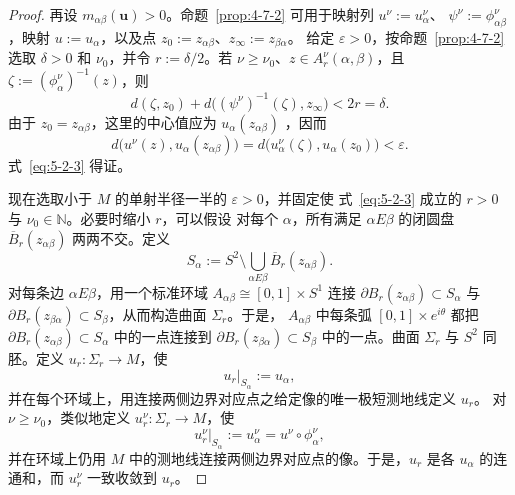 \begin{proof}
再设 $m_{\alpha\beta}(\mathbf u)>0$。命题~\ref{prop:4-7-2} 可用于映射列
$u^\nu:=u_\alpha^\nu$、
$\psi^\nu:=\phi_{\alpha\beta}^\nu$
，映射
$u:=u_\alpha$，以及点 $z_0:=z_{\alpha\beta}$、$z_\infty:=z_{\beta\alpha}$。
给定 $\varepsilon>0$，按命题~\ref{prop:4-7-2} 选取 $\delta>0$ 和 $\nu_0$，并令
$r:=\delta/2$。若 $\nu\ge\nu_0$、$z\in A_r^\nu(\alpha,\beta)$，且
$\zeta:=(\phi_\alpha^\nu)^{-1}(z)$，则
\[
  d(\zeta,z_0)+d\bigl((\psi^\nu)^{-1}(\zeta),z_\infty\bigr)<2r=\delta.
\]
由于 $z_0=z_{\alpha\beta}$，这里的中心值应为
$u_\alpha(z_{\alpha\beta})$
，因而
\[
  d\bigl(u^\nu(z),u_\alpha(z_{\alpha\beta})\bigr)
  =d\bigl(u_\alpha^\nu(\zeta),u_\alpha(z_0)\bigr)<\varepsilon.
\]
式~\eqref{eq:5-2-3} 得证。

现在选取小于 $M$ 的单射半径一半的 $\varepsilon>0$，并固定使
式~\eqref{eq:5-2-3} 成立的 $r>0$ 与 $\nu_0\in\mathbb N$。必要时缩小 $r$，可以假设
对每个 $\alpha$，所有满足 $\alpha E\beta$ 的闭圆盘
$\overline B_r(z_{\alpha\beta})$ 两两不交。定义
\[
  S_\alpha:=S^2\setminus
  \bigcup_{\alpha E\beta}\overline B_r(z_{\alpha\beta}).
\]
对每条边 $\alpha E\beta$，用一个标准环域
$A_{\alpha\beta}\cong[0,1]\times S^1$ 连接
$\partial B_r(z_{\alpha\beta})\subset S_\alpha$ 与
$\partial B_r(z_{\beta\alpha})\subset S_\beta$，从而构造曲面 $\Sigma_r$。于是，
$A_{\alpha\beta}$ 中每条弧 $[0,1]\times e^{i\theta}$ 都把
$\partial B_r(z_{\alpha\beta})\subset S_\alpha$ 中的一点连接到
$\partial B_r(z_{\beta\alpha})\subset S_\beta$ 中的一点。曲面 $\Sigma_r$ 与 $S^2$
同胚。定义 $u_r:\Sigma_r\to M$，使
\[
  u_r|_{S_\alpha}:=u_\alpha,
\]
并在每个环域上，用连接两侧边界对应点之给定像的唯一极短测地线定义 $u_r$。
对 $\nu\ge\nu_0$，类似地定义 $u_r^\nu:\Sigma_r\to M$，使
\[
  u_r^\nu|_{S_\alpha}:=u_\alpha^\nu
  =u^\nu\circ\phi_\alpha^\nu,
\]
并在环域上仍用 $M$ 中的测地线连接两侧边界对应点的像。于是，$u_r$ 是各
$u_\alpha$ 的连通和，而 $u_r^\nu$ 一致收敛到 $u_r$。


\end{proof}
